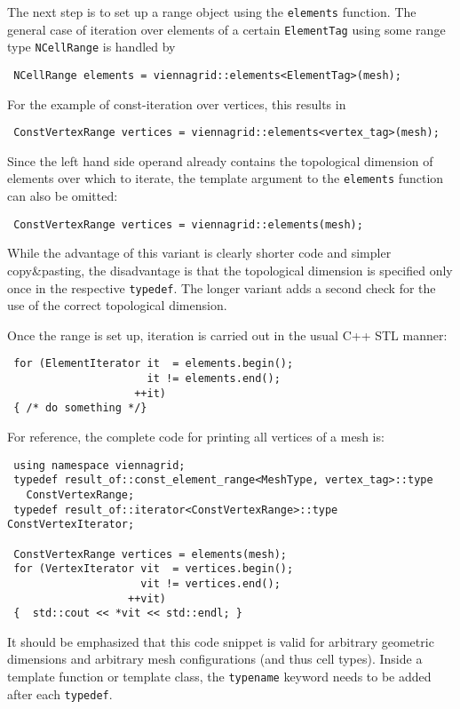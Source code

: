 The next step is to set up a range object using the \lstinline|elements| function.
The general case of iteration over elements of a certain \lstinline|ElementTag| using some range type \lstinline|NCellRange| is handled by
\begin{lstlisting}
 NCellRange elements = viennagrid::elements<ElementTag>(mesh);
\end{lstlisting}
For the example of const-iteration over vertices, this results in
\begin{lstlisting}
 ConstVertexRange vertices = viennagrid::elements<vertex_tag>(mesh);
\end{lstlisting}
Since the left hand side operand already contains the topological dimension of elements over which to iterate,
the template argument to the \lstinline|elements| function can also be omitted:
\begin{lstlisting}
 ConstVertexRange vertices = viennagrid::elements(mesh);
\end{lstlisting}
While the advantage of this variant is clearly shorter code and simpler copy\&pasting, the disadvantage is that the topological dimension is specified only once in the respective \lstinline|typedef|.
The longer variant adds a second check for the use of the correct topological dimension.

Once the range is set up, iteration is carried out in the usual C++ STL manner:
\begin{lstlisting}
 for (ElementIterator it  = elements.begin();
                      it != elements.end();
                    ++it)
 { /* do something */}
\end{lstlisting}
For reference, the complete code for printing all vertices of a mesh is:
\begin{lstlisting}
 using namespace viennagrid;
 typedef result_of::const_element_range<MeshType, vertex_tag>::type
   ConstVertexRange;
 typedef result_of::iterator<ConstVertexRange>::type ConstVertexIterator;

 ConstVertexRange vertices = elements(mesh);
 for (VertexIterator vit  = vertices.begin();
                     vit != vertices.end();
                   ++vit)
 {  std::cout << *vit << std::endl; }
\end{lstlisting}
It should be emphasized that this code snippet is valid for arbitrary geometric dimensions and arbitrary mesh configurations (and thus cell types). Inside a template function or template class, the \lstinline|typename| keyword needs to be added after each \lstinline|typedef|.



